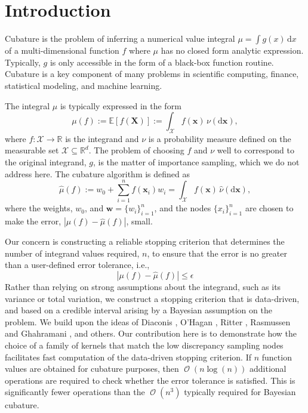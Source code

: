 \documentclass[smallextended]{svjour3}       %
\DeclareMathOperator{\Order}{{\mathcal O}}
\newcommand{\bm}[1]{\boldsymbol{#1}}
\newcommand{\dif}[1]{\text{d}{#1}}
\newcommand{\reals}{\mathbb{R}}
\newcommand{\cx}{\mathcal{X}}
\newcommand{\vw}{\bm{w}}
\newcommand{\vx}{\bm{x}}
\newcommand{\hmu}{\hat{\mu}}
\newcommand{\errtol}{\epsilon}
\def\abs#1{\ensuremath{\left \lvert #1 \right \rvert}}
\begin{document}
\section{Introduction}
\label{intro}
Cubature is the problem of inferring a numerical value integral 
$\mu = \int g(x) \, \dif x$ of a multi-dimensional function $f$ where $\mu$ has no closed form analytic expression. Typically, $g$ is only accessible in the form of a black-box function routine. 
Cubature is a key component of many problems in scientific computing, finance, statistical modeling, and machine learning.  




The integral $\mu$ is typically expressed in the form
\begin{equation}
\label{eqn:defn_mu}
\mu(f) := \mathbb{E}[f(\bm{X})] := \int_{\mathcal{X}} f(\vx)\, \nu(\dif\vx),
\end{equation}
where $f:\cx \to \reals$ is the integrand and $\nu$ is a probability measure defined on the measurable set $\cx \subseteq \reals^d$.  The problem of choosing $f$ and $\nu$ well to correspond to the original integrand, $g$, is the matter of importance sampling, which we do not address here.  The cubature algorithm is defined as
\begin{equation}
\label{eqn:defn_hmu}  %
\hmu(f) := w_0 + \sum_{i=1}^{n} f(\vx_i) w_i = \int_{\mathcal{X}} f(\vx)\, \hat{\nu}(\dif\vx),
\end{equation}
where the weights, $w_0$, and  $\vw = \{w_i\}_{i=1}^n$, and the nodes $\{x_i\}_{i=1}^n$ are chosen to make the error, $\abs{\mu(f) - \hmu(f)}$, small.

Our concern is constructing a reliable stopping criterion that determines the number of integrand values required, $n$, to ensure that the error is no greater than a user-defined error tolerance, i.e., 
\[
\abs{\mu(f) - \hmu(f)} \leq \errtol 
\] 
Rather than relying on strong assumptions about the integrand, such as its variance or total variation, we construct a stopping criterion that is data-driven, and based on a credible interval arising by a Bayesian assumption on the problem.  We build upon the ideas of Diaconis \cite{DiaconisBayesian}, O'Hagan \cite{HagenBayes}, Ritter \cite{RiterAverage}, Rasmussen and Ghahramani \cite{RasmussenBayesian}, and others.  Our contribution here is to demonstrate how the choice of a family of kernels that match the low discrepancy sampling nodes facilitates fast computation of the data-driven stopping criterion.  If $n$ function values are obtained for cubature purposes, then $\Order(n \log(n))$ additional operations are required to check whether the error tolerance is satisfied.  This is significantly fewer operations than the $\Order(n^3)$ typically required for Bayesian cubature.
\end{document}
